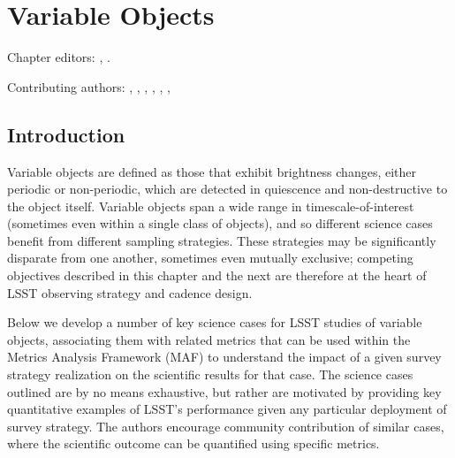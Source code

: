 
\chapter[Variable Objects]{Variable Objects}
\def\chpname{variables}\label{chp:\chpname}

Chapter editors:
,
.

Contributing authors:
,
,
,
,
,
,



\section{Introduction}

Variable objects are defined as those that exhibit brightness changes,
either periodic or non-periodic, which are detected in quiescence and
non-destructive to the object itself. Variable objects span a wide range
in timescale-of-interest (sometimes even within a single class of
objects), and so different science cases benefit from different sampling
strategies. These strategies may be significantly disparate from one
another, sometimes even mutually exclusive; competing objectives
described in this chapter and the next are therefore at the heart of
LSST observing strategy and cadence design.

Below we develop a number of key science cases for LSST studies of
variable objects, associating them with related metrics that can be used
within the Metrics Analysis Framework (MAF) to understand the impact of
a given survey strategy realization on the scientific results for that
case. The science cases outlined are by no means exhaustive, but rather
are motivated by providing key quantitative examples of LSST's
performance given any particular deployment of survey strategy. The
authors encourage community contribution of similar cases, where the
scientific outcome can be quantified using specific metrics.




